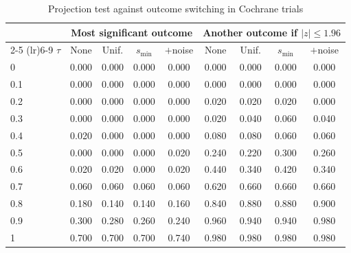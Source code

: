 \begin{table}[htbp]
\centering
\caption{Projection test against outcome switching in Cochrane trials}
\label{tab:cochrane_switching_power_proj}
\footnotesize
\setlength{\tabcolsep}{4pt}
\begin{tabular}{lcccccccc}
\toprule
 & \multicolumn{4}{c}{Most significant outcome} & \multicolumn{4}{c}{Another outcome if $|z| \le 1.96$} \\
\cmidrule(lr){2-5} \cmidrule(lr){6-9}
$\tau$ & None & Unif. & $s_{\min}$ & $+$noise & None & Unif. & $s_{\min}$ & $+$noise \\
\midrule
0 & 0.000 & 0.000 & 0.000 & 0.000 & 0.000 & 0.000 & 0.000 & 0.000 \\
0.1 & 0.000 & 0.000 & 0.000 & 0.000 & 0.000 & 0.000 & 0.000 & 0.000 \\
0.2 & 0.000 & 0.000 & 0.000 & 0.000 & 0.020 & 0.020 & 0.020 & 0.000 \\
0.3 & 0.000 & 0.000 & 0.000 & 0.000 & 0.020 & 0.040 & 0.060 & 0.040 \\
0.4 & 0.020 & 0.000 & 0.000 & 0.000 & 0.080 & 0.080 & 0.060 & 0.060 \\
0.5 & 0.000 & 0.000 & 0.000 & 0.020 & 0.240 & 0.220 & 0.300 & 0.260 \\
0.6 & 0.020 & 0.020 & 0.000 & 0.020 & 0.440 & 0.340 & 0.420 & 0.340 \\
0.7 & 0.060 & 0.060 & 0.060 & 0.060 & 0.620 & 0.660 & 0.660 & 0.660 \\
0.8 & 0.180 & 0.140 & 0.140 & 0.160 & 0.840 & 0.880 & 0.880 & 0.900 \\
0.9 & 0.300 & 0.280 & 0.260 & 0.240 & 0.960 & 0.940 & 0.940 & 0.980 \\
1 & 0.700 & 0.700 & 0.700 & 0.740 & 0.980 & 0.980 & 0.980 & 0.980 \\
\bottomrule
\end{tabular}
\par\smallskip

\end{table}
